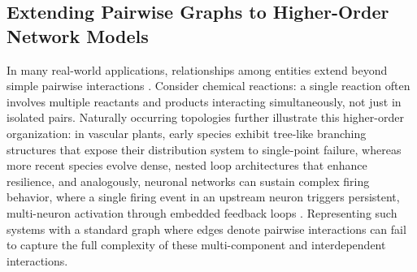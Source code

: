 \documentclass{article}
\begin{document}
\subsection{Extending Pairwise Graphs to Higher-Order Network Models}
In many real-world applications, relationships among entities extend beyond simple pairwise interactions \cite{bick_what_2023, bretto_hypergraph_2013, chodrow_configuration_2020}. Consider chemical reactions: a single reaction often involves multiple reactants and products interacting simultaneously, not just in isolated pairs. Naturally occurring topologies further illustrate this higher-order organization: in vascular plants, early species exhibit tree-like branching structures that expose their distribution system to single-point failure, whereas more recent species evolve dense, nested loop architectures that enhance resilience, and analogously, neuronal networks can sustain complex firing behavior, where a single firing event in an upstream neuron triggers persistent, multi-neuron activation through embedded feedback loops \cite{sriraman_topology_2021, Cranford2013Materiomics_AM, chen_molecular_2024, aldeghi_graph_2022, ferraz_de_arruda_contagion_2024,Marom2025BioMaterialIntelligence,Cranford2013Materiomics_AM}. Representing such systems with a standard graph where edges denote pairwise interactions can fail to capture the full complexity of these multi-component and interdependent interactions. 
\end{document}
